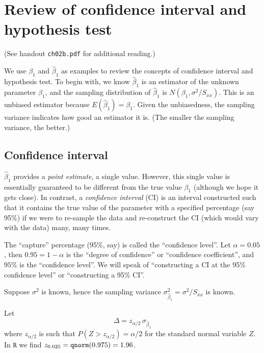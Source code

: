 \documentclass[12pt]{article}
\begin{document}
\newpage

\section{Review of confidence interval and hypothesis test}

(See handout \texttt{ch02b.pdf} for additional reading.)

We use $\beta_1$ and $\hat\beta_1$ as examples
to review the concepts of confidence interval and hypothesis test.
To begin with,
we know $\hat\beta_1$ is an estimator of the unknown parameter
$\beta_1$,
and the sampling distribution of $\hat\beta_1$ is
$N(\beta_1, \sigma^2/S_{xx})$.
This is an unbiased estimator because
$E(\hat\beta_1) = \beta_1$.
Given the unbiasedness,
the sampling variance indicates how good
an estimator it is.
(The smaller the sampling variance, the better.)

\subsection{Confidence interval}

$\hat\beta_1$ provides a \emph{point estimate},
\ie a single value.
However, this single value is essentially guaranteed to
be different from the true value $\beta_1$
(although we hope it gets close).
In contrast,
a \emph{confidence interval} (CI)
is an interval constructed such that it
contains the true value of the parameter with a specified
percentage (say 95\%)
if we were to re-sample the data
and re-construct the CI (which would vary with the data)
many, many times.

The ``capture'' percentage (95\%, say)
is called the ``confidence level''.
Let $\alpha = 0.05$,
then $0.95 = 1 - \alpha$ is the ``degree of confidence'' or
``confidence coefficient'',
and $95\%$ is the ``confidence level''.
We will speak of
``constructing a CI at the 95\% confidence level''
or
``constructing a 95\% CI''.

Suppose $\sigma^2$ is known,
hence the sampling variance $\sigma^2_{\hat\beta_1} = \sigma^2/S_{xx}$
is known.

Let
\[
\Delta = z_{\alpha/2}\, \sigma_{\hat\beta_1}
\]
where
$z_{\alpha/2}$ is such that
$P(Z > z_{\alpha/2}) = \alpha/2$
for the standard normal variable $Z$.
In $\texttt{R}$ we find
$z_{0.025} = \text{\texttt{qnorm}}(0.975) = 1.96$.
\end{document}
